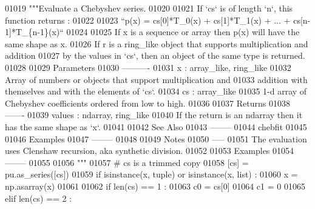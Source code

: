 \begin{DoxyCode}
01019     \textcolor{stringliteral}{"""Evaluate a Chebyshev series.}
01020 \textcolor{stringliteral}{}
01021 \textcolor{stringliteral}{    If `cs` is of length `n`, this function returns :}
01022 \textcolor{stringliteral}{}
01023 \textcolor{stringliteral}{    ``p(x) = cs[0]*T\_0(x) + cs[1]*T\_1(x) + ... + cs[n-1]*T\_\{n-1\}(x)``}
01024 \textcolor{stringliteral}{}
01025 \textcolor{stringliteral}{    If x is a sequence or array then p(x) will have the same shape as x.}
01026 \textcolor{stringliteral}{    If r is a ring\_like object that supports multiplication and addition}
01027 \textcolor{stringliteral}{    by the values in `cs`, then an object of the same type is returned.}
01028 \textcolor{stringliteral}{}
01029 \textcolor{stringliteral}{    Parameters}
01030 \textcolor{stringliteral}{    ----------}
01031 \textcolor{stringliteral}{    x : array\_like, ring\_like}
01032 \textcolor{stringliteral}{        Array of numbers or objects that support multiplication and}
01033 \textcolor{stringliteral}{        addition with themselves and with the elements of `cs`.}
01034 \textcolor{stringliteral}{    cs : array\_like}
01035 \textcolor{stringliteral}{        1-d array of Chebyshev coefficients ordered from low to high.}
01036 \textcolor{stringliteral}{}
01037 \textcolor{stringliteral}{    Returns}
01038 \textcolor{stringliteral}{    -------}
01039 \textcolor{stringliteral}{    values : ndarray, ring\_like}
01040 \textcolor{stringliteral}{        If the return is an ndarray then it has the same shape as `x`.}
01041 \textcolor{stringliteral}{}
01042 \textcolor{stringliteral}{    See Also}
01043 \textcolor{stringliteral}{    --------}
01044 \textcolor{stringliteral}{    chebfit}
01045 \textcolor{stringliteral}{}
01046 \textcolor{stringliteral}{    Examples}
01047 \textcolor{stringliteral}{    --------}
01048 \textcolor{stringliteral}{}
01049 \textcolor{stringliteral}{    Notes}
01050 \textcolor{stringliteral}{    -----}
01051 \textcolor{stringliteral}{    The evaluation uses Clenshaw recursion, aka synthetic division.}
01052 \textcolor{stringliteral}{}
01053 \textcolor{stringliteral}{    Examples}
01054 \textcolor{stringliteral}{    --------}
01055 \textcolor{stringliteral}{}
01056 \textcolor{stringliteral}{    """}
01057     \textcolor{comment}{# cs is a trimmed copy}
01058     [cs] = pu.as\_series([cs])
01059     \textcolor{keywordflow}{if} isinstance(x, tuple) \textcolor{keywordflow}{or} isinstance(x, list) :
01060         x = np.asarray(x)
01061 
01062     \textcolor{keywordflow}{if} len(cs) == 1 :
01063         c0 = cs[0]
01064         c1 = 0
01065     \textcolor{keywordflow}{elif} len(cs) == 2 :

\end{DoxyCode}

